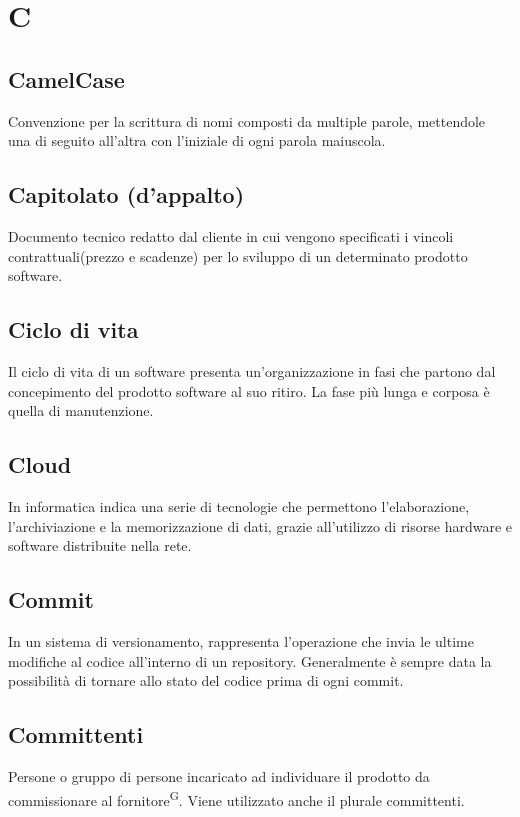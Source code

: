 \section{C}

\subsection{CamelCase}
Convenzione per la scrittura di nomi composti da multiple parole, mettendole una di seguito all'altra con l'iniziale di ogni parola maiuscola. 

\subsection{Capitolato (d'appalto)}
Documento tecnico redatto dal cliente in cui vengono specificati i vincoli contrattuali(prezzo e scadenze) per lo sviluppo di un determinato prodotto software.

\subsection{Ciclo di vita}
Il ciclo di vita di un software presenta un'organizzazione in fasi che partono dal concepimento del prodotto software al suo ritiro. La fase più lunga e corposa è quella di manutenzione.



\subsection{Cloud}
In informatica indica una serie di tecnologie che permettono l’elaborazione, l’archiviazione e la memorizzazione di dati, grazie all’utilizzo di risorse hardware e software distribuite nella rete.



\subsection{Commit}
In un sistema di versionamento, rappresenta l'operazione che invia le ultime modifiche al codice all'interno di un repository. Generalmente è sempre data la possibilità di tornare allo stato del codice prima di ogni commit.


\subsection{Committenti}
Persone o gruppo di persone incaricato ad individuare il prodotto da commissionare al fornitore\textsuperscript{G}. Viene utilizzato anche il plurale committenti.



